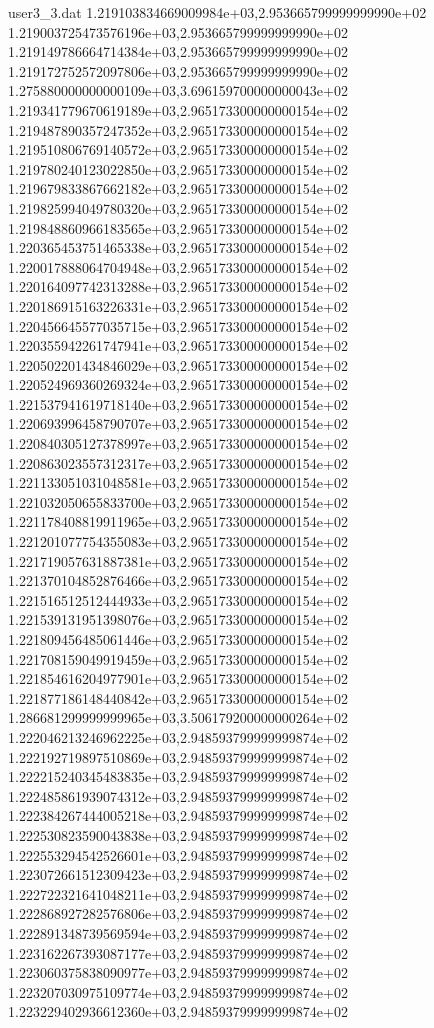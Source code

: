 \begin{filecontents}{user3_3.dat}
1.219103834669009984e+03,2.953665799999999990e+02
1.219003725473576196e+03,2.953665799999999990e+02
1.219149786664714384e+03,2.953665799999999990e+02
1.219172752572097806e+03,2.953665799999999990e+02
1.275880000000000109e+03,3.696159700000000043e+02
1.219341779670619189e+03,2.965173300000000154e+02
1.219487890357247352e+03,2.965173300000000154e+02
1.219510806769140572e+03,2.965173300000000154e+02
1.219780240123022850e+03,2.965173300000000154e+02
1.219679833867662182e+03,2.965173300000000154e+02
1.219825994049780320e+03,2.965173300000000154e+02
1.219848860966183565e+03,2.965173300000000154e+02
1.220365453751465338e+03,2.965173300000000154e+02
1.220017888064704948e+03,2.965173300000000154e+02
1.220164097742313288e+03,2.965173300000000154e+02
1.220186915163226331e+03,2.965173300000000154e+02
1.220456645577035715e+03,2.965173300000000154e+02
1.220355942261747941e+03,2.965173300000000154e+02
1.220502201434846029e+03,2.965173300000000154e+02
1.220524969360269324e+03,2.965173300000000154e+02
1.221537941619718140e+03,2.965173300000000154e+02
1.220693996458790707e+03,2.965173300000000154e+02
1.220840305127378997e+03,2.965173300000000154e+02
1.220863023557312317e+03,2.965173300000000154e+02
1.221133051031048581e+03,2.965173300000000154e+02
1.221032050655833700e+03,2.965173300000000154e+02
1.221178408819911965e+03,2.965173300000000154e+02
1.221201077754355083e+03,2.965173300000000154e+02
1.221719057631887381e+03,2.965173300000000154e+02
1.221370104852876466e+03,2.965173300000000154e+02
1.221516512512444933e+03,2.965173300000000154e+02
1.221539131951398076e+03,2.965173300000000154e+02
1.221809456485061446e+03,2.965173300000000154e+02
1.221708159049919459e+03,2.965173300000000154e+02
1.221854616204977901e+03,2.965173300000000154e+02
1.221877186148440842e+03,2.965173300000000154e+02
1.286681299999999965e+03,3.506179200000000264e+02
1.222046213246962225e+03,2.948593799999999874e+02
1.222192719897510869e+03,2.948593799999999874e+02
1.222215240345483835e+03,2.948593799999999874e+02
1.222485861939074312e+03,2.948593799999999874e+02
1.222384267444005218e+03,2.948593799999999874e+02
1.222530823590043838e+03,2.948593799999999874e+02
1.222553294542526601e+03,2.948593799999999874e+02
1.223072661512309423e+03,2.948593799999999874e+02
1.222722321641048211e+03,2.948593799999999874e+02
1.222868927282576806e+03,2.948593799999999874e+02
1.222891348739569594e+03,2.948593799999999874e+02
1.223162267393087177e+03,2.948593799999999874e+02
1.223060375838090977e+03,2.948593799999999874e+02
1.223207030975109774e+03,2.948593799999999874e+02
1.223229402936612360e+03,2.948593799999999874e+02

\end{filecontents}
